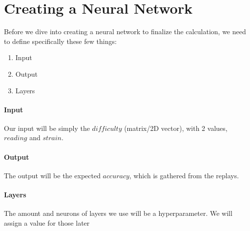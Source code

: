 

\section{Creating a Neural Network}

Before we dive into creating a neural network to finalize the calculation, we need to define specifically these few things:

\begin{enumerate}
	\item Input
	\item Output
	\item Layers
\end{enumerate}

\paragraph{Input} Our input will be simply the $difficulty$ (matrix/2D vector), with 2 values, $reading$ and $strain$.

\paragraph{Output} The output will be the expected $accuracy$, which is gathered from the replays.

\paragraph{Layers} The amount and neurons of layers we use will be a hyperparameter. We will assign a value for those later




